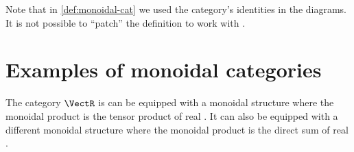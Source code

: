 \begin{remark}
    Note that in \cref{def:monoidal-cat} we used the category's identities in the diagrams.
    It is not possible to ``patch'' the definition to work with .
\end{remark}

\section{Examples of monoidal categories}



\begin{example}
    \label{ex:Vect-symmetric-monoidal}
    The category $\VectR$ is can be equipped with a monoidal structure where the monoidal product is the tensor product of real .
    It can also be equipped with a different monoidal structure where the monoidal product is the direct sum of real .
\end{example}


